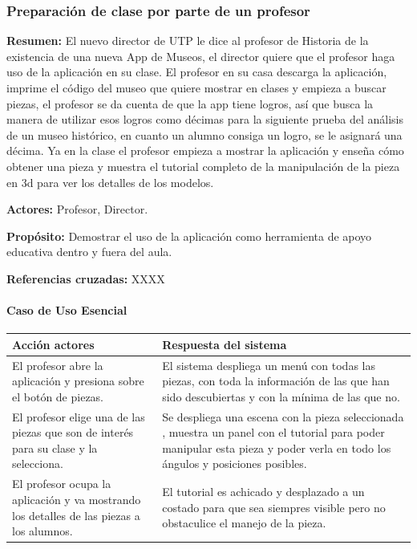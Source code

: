 \subsubsection{Preparación de clase por parte de un profesor}

{\textbf {Resumen:}}
El nuevo director de UTP le dice al profesor de Historia de la existencia de una nueva App de Museos, el director quiere que el profesor haga uso de la aplicación en su clase. El profesor en su casa descarga la aplicación, imprime el código del museo que quiere mostrar en clases y empieza a buscar piezas, el profesor se da cuenta de que la app tiene logros, así que busca la manera de utilizar esos logros como décimas para la siguiente prueba del análisis de un museo histórico, en cuanto un alumno consiga un logro, se le asignará una décima. Ya en la clase el profesor empieza a mostrar la aplicación y enseña cómo obtener una pieza y muestra el tutorial completo de la manipulación de la pieza en 3d para ver los detalles de los modelos.


{\textbf {Actores:}}
Profesor, Director.

{\textbf {Propósito:}}
Demostrar el uso de la aplicación como herramienta de apoyo educativa dentro y fuera del aula.

{\textbf {Referencias cruzadas:}}
XXXX

\paragraph{Caso de Uso Esencial}

\begin{longtable}{|p{5cm}|p{8cm}|}
\hline 
Acción actores & Respuesta del sistema \\ 
\hline 
El profesor abre la aplicación y presiona sobre el botón de piezas. & El sistema despliega un menú con todas las piezas, con toda la información de las que han sido descubiertas y con la mínima de las que no. \\ 
\hline
El profesor elige una de las piezas que son de interés para su clase y la selecciona. & Se despliega una escena con la pieza seleccionada , muestra un panel con el tutorial para poder manipular esta pieza y poder verla en todo los ángulos y posiciones posibles. \\ 
\hline 
El profesor ocupa la aplicación y va mostrando los detalles de las piezas a los alumnos. & El tutorial es achicado y desplazado a un costado para que sea siempres visible pero no obstaculice el manejo de la pieza. \\ 
\hline 
\end{longtable}

